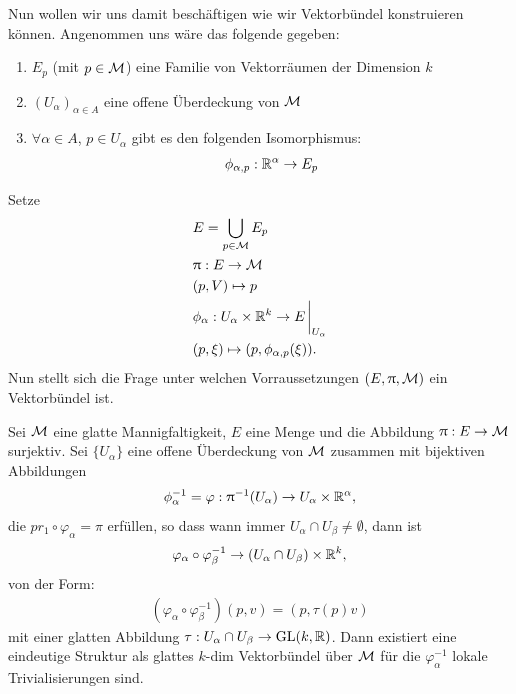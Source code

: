 Nun wollen wir uns damit beschäftigen wie wir Vektorbündel konstruieren können.
Angenommen uns wäre das folgende gegeben:
\begin{enumerate}
\item $E_p$ (mit $p\in \mathcal{M}$) eine Familie von Vektorräumen der Dimension $k$
\item $(U_\alpha)_{\alpha \in A}$ eine offene Überdeckung von $\mathcal{M}$
\item $\forall \alpha \in A$, $p\in U_\alpha$ gibt es den folgenden Isomorphismus:
\begin{align}
\phi_{\alpha, p}: \mathbb{R}^\alpha \to E_p
\end{align}
\end{enumerate}
Setze 
\begin{align}
&E = \bigcup_{p \in \mfk} E_p\\
&\pi : E \to \mfk\\
&(p, V) \mapsto p\\
&\phi_\alpha: U_\alpha \times \R^k \to E \eval_{U_\alpha}\\
&(p, \xi) \mapsto (p, \phi_{\alpha, p}(\xi)).
\end{align}
Nun stellt sich die Frage unter welchen Vorraussetzungen $(E, \uppi, \mathcal{M})$ ein Vektorbündel ist.
\begin{lem}
\label{lem:vorraussetzungenvektorbündel}
Sei $\mathcal{M}$ eine glatte Mannigfaltigkeit, $E$ eine Menge und die Abbildung $\uppi: E\to\mathcal{M}$ surjektiv.
Sei $\{ U_\alpha \}$ eine offene Überdeckung von $\mathcal{M}$ zusammen mit bijektiven Abbildungen
\begin{align}
\phi^{-1}_{\alpha} = \varphi: \uppi^{-1}(U_\alpha) \to U_\alpha \times \mathbb{R}^\alpha,
\end{align}
die $pr_1 \circ \varphi_\alpha = \pi$ erfüllen, so dass wann immer $U_\alpha \cap U_\beta \neq \emptyset$, dann ist 
\begin{align}
\varphi_\alpha \circ \varphi_{\beta}^{-1} \to (U_\alpha \cap U_\beta) \times \mathbb{R}^k,
\end{align}
von der Form:
\begin{align}
\label{eq:konstruktionvektorbündel}
(\varphi_\alpha \circ \varphi_{\beta}^{-1})(p, v) = (p, \tau(p) v)
\end{align}
mit einer glatten Abbildung $\tau: U_\alpha \cap U_\beta \to \mathrm{GL}(k, \mathbb{R})$.
Dann existiert eine eindeutige Struktur als glattes $k$-dim Vektorbündel über $\mathcal{M}$ für die $\varphi^{-1}_{\alpha}$ lokale Trivialisierungen sind.
\end{lem}
